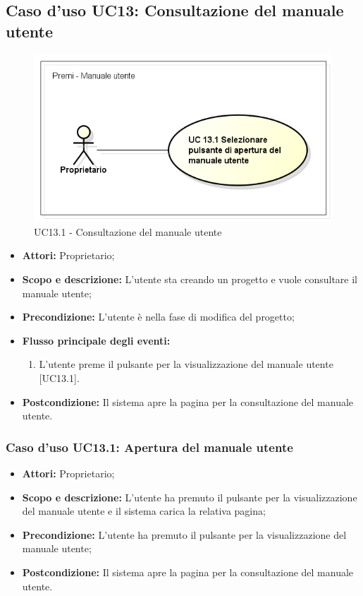 \subsection{Caso d'uso UC13: Consultazione del manuale utente}
\begin{figure}[h] 
	\centering 
	\includegraphics[scale=0.45] {img/UC13.1.png}
	\caption{UC13.1 - Consultazione del manuale utente} 
\end{figure}

\begin{itemize}
	\item \textbf{Attori:} Proprietario;
	\item \textbf{Scopo e descrizione:} L'utente sta creando un progetto e vuole consultare il manuale utente;
	\item \textbf{Precondizione:} L'utente è nella fase di modifica del progetto;
	\item \textbf{Flusso principale degli eventi:}
	\begin{enumerate}
		\item L'utente preme il pulsante per la visualizzazione del manuale utente [UC13.1].
	\end{enumerate}
	\item \textbf{Postcondizione:} Il sistema apre la pagina per la consultazione del manuale utente.
\end{itemize}


\subsubsection{Caso d'uso UC13.1: Apertura del manuale utente}
\begin{itemize}
	\item \textbf{Attori:} Proprietario;
	\item \textbf{Scopo e descrizione:} L'utente ha premuto il pulsante per la visualizzazione del manuale utente e il sistema carica la relativa pagina;
	\item \textbf{Precondizione:} L'utente ha premuto il pulsante per la visualizzazione del manuale utente;
		\item \textbf{Postcondizione:} Il sistema apre la pagina per la consultazione del manuale utente.
	\end{itemize}